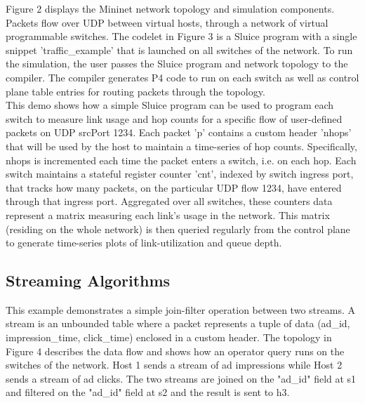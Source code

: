 \noindent Figure 2 displays the Mininet network topology and simulation components. Packets flow over UDP between virtual hosts, through a network of virtual programmable switches. The codelet in Figure 3 is a Sluice program with a single snippet 'traffic\_example' that is launched on all switches of the network. To run the simulation, the user passes the Sluice program and network topology to the compiler. The compiler generates P4 code to run on each switch as well as control plane table entries for routing packets through the topology.  \\
\indent This demo shows how a simple Sluice program can be used to program each switch to measure link usage and hop counts for a specific flow of user-defined packets on UDP srcPort 1234. Each packet 'p' contains a custom header 'nhops' that will be used by the host to maintain a time-series of hop counts. Specifically, nhops is incremented each time the packet enters a switch, i.e. on each hop. Each switch maintains a stateful register counter 'cnt', indexed by switch ingress port, that tracks how many packets, on the particular UDP flow 1234, have entered through that ingress port. Aggregated over all switches, these counters data represent a matrix measuring each link's usage in the network. This matrix (residing on the whole network) is then queried regularly from the control plane to generate time-series plots of link-utilization and queue depth.  
 
    
\subsection{Streaming Algorithms}
This example demonstrates a simple join-filter operation between two streams. A stream is an unbounded table where a packet represents a tuple of data (ad\_id, impression\_time, click\_time) enclosed in a custom header. The topology in Figure 4 describes the data flow and shows how an operator query runs on the switches of the network. Host 1 sends a stream of ad impressions while Host 2 sends a stream of ad clicks. The two streams are joined on the "ad\_id" field at s1 and filtered on the "ad\_id" field at s2 and the result is sent to h3. 


